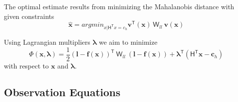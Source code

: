 The optimal estimate results from minimizing the Mahalanobis distance with given constraints
\begin{equation}
\widehat{\boldsymbol x}=
argmin_{x|\mathsf{H^T}x=c_h}
\boldsymbol v^\mathsf{T}(\boldsymbol x)\:
\mathsf{W}_{ll}\:
\boldsymbol v(\boldsymbol x)
\end{equation}

Using Lagrangian multipliers $\boldsymbol \lambda$ we aim to minimize
\begin{equation}
\Phi(\boldsymbol x,\boldsymbol \lambda)=
\dfrac{1}{2}
(\boldsymbol l-\boldsymbol f(\boldsymbol x))^\mathsf{T}\:
\mathsf{W}_{ll}\:
(\boldsymbol l-\boldsymbol f(\boldsymbol x))+
\boldsymbol \lambda^\mathsf{T}
(\mathsf{H^T}\boldsymbol x-\boldsymbol c_h)
\end{equation}
with respect to $\boldsymbol x$ and $\boldsymbol \lambda$.
%


\subsection{Observation Equations}
\label{subsec:ObsEqua}

